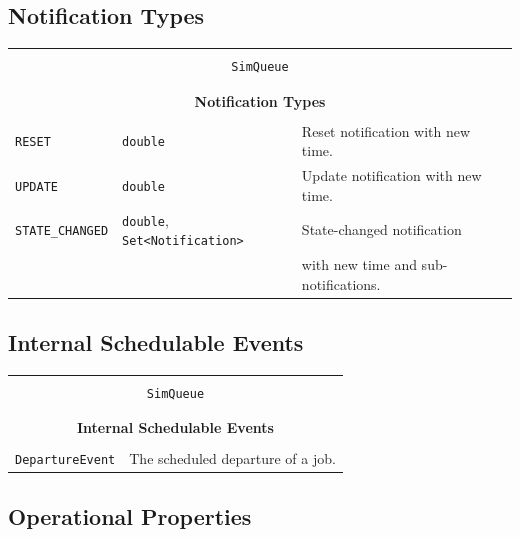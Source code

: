 \documentclass[12pt]{book}
\begin{document}
\subsection{Notification Types}

\begin{tabular}{|l|l|l|}
\hline
\multicolumn{3}{|c|}{} \\
\multicolumn{3}{|c|}{\lstinline[basicstyle=\large]{SimQueue}} \\
\multicolumn{3}{|c|}{} \\
\hline
\multicolumn{3}{|c|}{} \\
\multicolumn{3}{|c|}{\bf Notification Types} \\
\multicolumn{3}{|c|}{} \\
\hline
\lstinline|RESET| & \lstinline|double| & Reset notification with new time. \\
\hline
\lstinline|UPDATE| & \lstinline|double| & Update notification with new time. \\
\hline
\lstinline|STATE_CHANGED| & \lstinline|double|, \lstinline|Set<Notification>|
                          & State-changed notification \\
                        & & with new time and sub-notifications. \\
\hline
\end{tabular}

\subsection{Internal Schedulable Events}

\begin{tabular}{|l|l|}
\hline
\multicolumn{2}{|c|}{} \\
\multicolumn{2}{|c|}{\lstinline[basicstyle=\large]{SimQueue}} \\
\multicolumn{2}{|c|}{} \\
\hline
\multicolumn{2}{|c|}{} \\
\multicolumn{2}{|c|}{\bf Internal Schedulable Events} \\
\multicolumn{2}{|c|}{} \\
\hline
\lstinline|DepartureEvent| & The scheduled departure of a job. \\
\hline
\end{tabular}

\subsection{Operational Properties}
\end{document}

